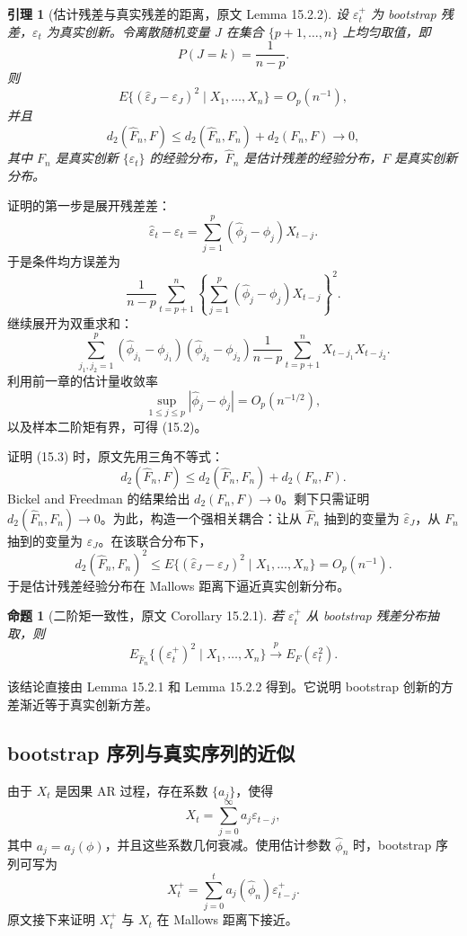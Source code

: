 \documentclass[11pt,a4paper,openany]{ctexbook}
\newtheorem{lemma}{引理}[section]
\newtheorem{proposition}{命题}[section]
\begin{document}
\begin{lemma}[估计残差与真实残差的距离，原文 Lemma 15.2.2]
设 \(\varepsilon_t^+\) 为 bootstrap 残差，\(\varepsilon_t\) 为真实创新。令离散随机变量 \(J\) 在集合 \(\{p+1,\ldots,n\}\) 上均匀取值，即
\[
  P(J=k)=\frac1{n-p}.
\]
则
\[
  E\{(\hat\varepsilon_J-\varepsilon_J)^2\mid X_1,\ldots,X_n\}
  =O_p(n^{-1}),
  \tag{15.2}
\]
并且
\[
  d_2(\hat F_n,F)
  \le d_2(\hat F_n,F_n)+d_2(F_n,F)\to0,
  \tag{15.3}
\]
其中 \(F_n\) 是真实创新 \(\{\varepsilon_t\}\) 的经验分布，\(\hat F_n\) 是估计残差的经验分布，\(F\) 是真实创新分布。
\end{lemma}

证明的第一步是展开残差差：
\[
  \hat\varepsilon_t-\varepsilon_t
  =\sum_{j=1}^p(\hat\phi_j-\phi_j)X_{t-j}.
\]
于是条件均方误差为
\[
  \frac1{n-p}\sum_{t=p+1}^n
  \left\{\sum_{j=1}^p(\hat\phi_j-\phi_j)X_{t-j}\right\}^2.
\]
继续展开为双重求和：
\[
  \sum_{j_1,j_2=1}^p(\hat\phi_{j_1}-\phi_{j_1})
  (\hat\phi_{j_2}-\phi_{j_2})
  \frac1{n-p}\sum_{t=p+1}^nX_{t-j_1}X_{t-j_2}.
\]
利用前一章的估计量收敛率
\[
  \sup_{1\le j\le p}|\hat\phi_j-\phi_j|=O_p(n^{-1/2}),
\]
以及样本二阶矩有界，可得 (15.2)。

证明 (15.3) 时，原文先用三角不等式：
\[
  d_2(\hat F_n,F)\le d_2(\hat F_n,F_n)+d_2(F_n,F).
\]
Bickel and Freedman 的结果给出 \(d_2(F_n,F)\to0\)。剩下只需证明 \(d_2(\hat F_n,F_n)\to0\)。为此，构造一个强相关耦合：让从 \(\hat F_n\) 抽到的变量为 \(\hat\varepsilon_J\)，从 \(F_n\) 抽到的变量为 \(\varepsilon_J\)。在该联合分布下，
\[
  d_2(\hat F_n,F_n)^2
  \le E\{(\hat\varepsilon_J-\varepsilon_J)^2\mid X_1,\ldots,X_n\}
  =O_p(n^{-1}).
\]
于是估计残差经验分布在 Mallows 距离下逼近真实创新分布。

\begin{proposition}[二阶矩一致性，原文 Corollary 15.2.1]
若 \(\varepsilon_t^+\) 从 bootstrap 残差分布抽取，则
\[
  E_{\hat F_n}\{(\varepsilon_t^+)^2\mid X_1,\ldots,X_n\}
  \xrightarrow{p} E_F(\varepsilon_t^2).
\]
\end{proposition}

该结论直接由 Lemma 15.2.1 和 Lemma 15.2.2 得到。它说明 bootstrap 创新的方差渐近等于真实创新方差。

\subsection{bootstrap 序列与真实序列的近似}

由于 \(X_t\) 是因果 AR 过程，存在系数 \(\{a_j\}\)，使得
\[
  X_t=\sum_{j=0}^{\infty}a_j\varepsilon_{t-j},
\]
其中 \(a_j=a_j(\phi)\)，并且这些系数几何衰减。使用估计参数 \(\hat\phi_n\) 时，bootstrap 序列可写为
\[
  X_t^+=\sum_{j=0}^{t}a_j(\hat\phi_n)\varepsilon_{t-j}^+.
\]
原文接下来证明 \(X_t^+\) 与 \(X_t\) 在 Mallows 距离下接近。
\end{document}
